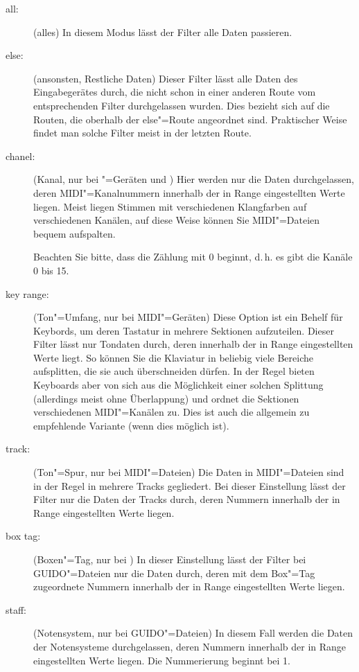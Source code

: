 \begin{description}
\item[all:] (alles) In diesem Modus lässt der Filter alle Daten
  passieren.
\item[else:] (ansonsten, Restliche Daten) Dieser Filter lässt alle
  Daten des Eingabegerätes durch, die nicht schon in einer anderen
  Route vom entsprechenden Filter durchgelassen wurden. Dies bezieht
  sich auf die Routen, die oberhalb der else"=Route angeordnet sind.
  Praktischer Weise findet man solche Filter meist in der letzten
  Route.
\item[chanel:] (Kanal, nur bei "=Geräten und
  ) Hier werden nur die Daten
  durchgelassen, deren MIDI"=Kanalnummern innerhalb der in Range
  eingestellten Werte liegen. Meist liegen Stimmen mit verschiedenen
  Klangfarben auf verschiedenen Kanälen, auf diese Weise können Sie
  MIDI"=Dateien bequem aufspalten.

  Beachten Sie bitte, dass \mutabor{} die Zählung mit 0 beginnt, d.\,h.
  es gibt die Kanäle 0 bis 15.

\item[key range:] (Ton"=Umfang, nur bei MIDI"=Geräten) Diese Option
  ist ein Behelf für Keybords, um deren Tastatur in mehrere Sektionen
  aufzuteilen. Dieser Filter lässt nur Tondaten durch, deren
   innerhalb der in
  Range eingestellten Werte liegt. So können Sie die Klaviatur in
  beliebig viele Bereiche aufsplitten, die sie auch überschneiden
  dürfen. In der Regel bieten Keyboards aber von sich aus die
  Möglichkeit einer solchen Splittung (allerdings meist ohne
  Überlappung) und ordnet die Sektionen verschiedenen MIDI"=Kanälen zu.
  Dies ist auch die allgemein zu empfehlende Variante (wenn dies
  möglich ist).

\item[track:] (Ton"=Spur, nur bei MIDI"=Dateien) Die Daten in
  MIDI"=Dateien sind in der Regel in mehrere Tracks gegliedert. Bei
  dieser Einstellung lässt der Filter nur die Daten der Tracks durch,
  deren Nummern innerhalb der in Range eingestellten Werte liegen.


\item[box tag:] (Boxen"=Tag, nur bei
  ) In dieser Einstellung lässt
  der Filter bei GUIDO"=Dateien nur die Daten durch, deren mit dem
  Box"=Tag zugeordnete Nummern innerhalb der in Range eingestellten
  Werte liegen.


\item[staff:] (Notensystem, nur bei GUIDO"=Dateien) In diesem Fall
  werden die Daten der Notensysteme durchgelassen, deren Nummern
  innerhalb der in Range eingestellten Werte liegen. Die Nummerierung
  beginnt bei 1.
\end{description}


